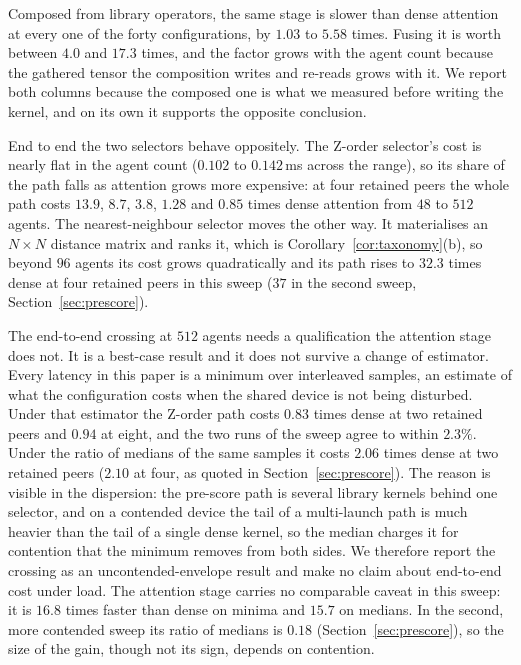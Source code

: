 Composed from library operators, the same stage is slower than dense attention
at every one of the forty configurations, by $1.03$ to $5.58$ times. Fusing it
is worth between $4.0$ and $17.3$ times, and the factor grows with the agent
count because the gathered tensor the composition writes and re-reads grows with
it. We report both columns because the composed one is what we measured before
writing the kernel, and on its own it supports the opposite conclusion.

End to end the two selectors behave oppositely. The Z-order selector's cost is
nearly flat in the agent count ($0.102$ to $0.142$\,ms across the range), so its share of the path falls as
attention grows more expensive: at four retained peers the whole path costs
$13.9$, $8.7$, $3.8$, $1.28$ and $0.85$ times dense attention from $48$ to $512$
agents. The nearest-neighbour selector moves the other way. It materialises an
$N \times N$ distance matrix and ranks it, which is
Corollary~\ref{cor:taxonomy}(b), so beyond $96$ agents its cost grows
quadratically and its path rises to $32.3$ times dense at four retained peers in
this sweep ($37$ in the second sweep, Section~\ref{sec:prescore}).

The end-to-end crossing at $512$ agents needs a qualification the attention
stage does not. It is a best-case result and it does not survive a change of
estimator. Every latency in this paper is a minimum over interleaved samples, an
estimate of what the configuration costs when the shared device is not being
disturbed. Under that estimator the Z-order path costs $0.83$ times dense at two
retained peers and $0.94$ at eight, and the two runs of the sweep agree to
within $2.3\%$. Under the ratio of medians of the same samples it costs $2.06$
times dense at two retained peers ($2.10$ at four, as quoted in
Section~\ref{sec:prescore}). The reason is visible in the dispersion: the pre-score path
is several library kernels behind one selector, and on a contended device the
tail of a multi-launch path is much heavier than the tail of a single dense
kernel, so the median charges it for contention that the minimum removes from
both sides. We therefore report the crossing as an uncontended-envelope result
and make no claim about end-to-end cost under load. The attention stage carries
no comparable caveat in this sweep: it is $16.8$ times faster than dense on
minima and $15.7$ on medians. In the second, more contended sweep its ratio of
medians is $0.18$ (Section~\ref{sec:prescore}), so the size of the gain, though
not its sign, depends on contention.

